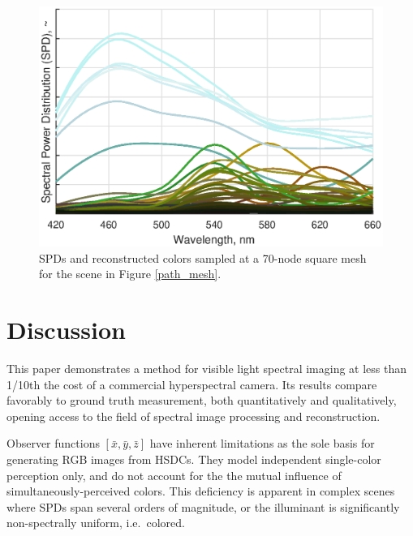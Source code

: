 \documentclass[twocolumn,10pt]{asme2ej}
\newcommand{\id}{\hspace{6 mm}}
\begin{document}
\begin{figure}[H]
\begin{centering}
\vspace{-3mm}
  \includegraphics[width=1.00\linewidth]{vermont_path.eps}
  \caption{SPDs and reconstructed colors sampled at a 70-node square mesh for the scene in Figure \ref{path_mesh}.}
  \label{path_SPDs}
  \end{centering}
\end{figure}


\clearpage
\twocolumn

\section{Discussion}

This paper demonstrates a method for visible light spectral imaging at less than 1/10th the cost of a commercial hyperspectral camera. Its results compare favorably to ground truth measurement, both quantitatively and qualitatively, opening access to the field of spectral image processing and reconstruction.

\id Observer functions $[ \bar{x}, \bar{y}, \bar{z} ]$ have inherent limitations as the sole basis for generating RGB images from HSDCs. They model independent single-color perception only, and do not account for the the mutual influence of simultaneously-perceived colors. This deficiency is apparent in complex scenes where SPDs span several orders of magnitude, or the illuminant is significantly non-spectrally uniform, i.e.\ colored.

%
\end{document}
